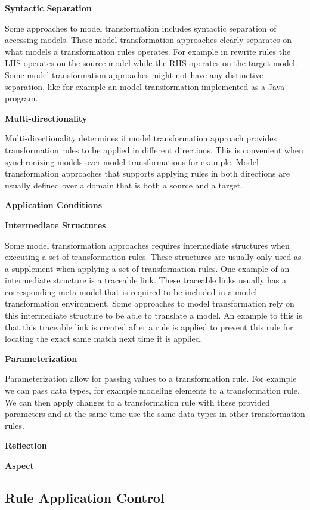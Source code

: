 \textbf{Syntactic Separation}

Some approaches to model transformation includes syntactic separation of
accessing models. These model transformation approaches clearly separates on
what models a transformation rules operates. For example in rewrite rules the
LHS operates on the source model while the RHS operates on the target model.
Some model transformation approaches might not have any distinctive separation,
like for example an model transformation implemented as a Java program. 

\textbf{Multi-directionality}

Multi-directionality determines if model transformation approach provides
transformation rules to be applied in different directions. This is convenient
when synchronizing models over model transformations for example. Model
transformation approaches that supports applying rules in both directions are
usually defined over a domain that is both a source and a target.


\textbf{Application Conditions}

\textbf{Intermediate Structures}

Some model transformation approaches requires intermediate structures when
executing a set of transformation rules. These structures are usually only
used as a supplement when applying a set of transformation rules. One
example of an intermediate structure is a traceable link. These traceable links
usually has a corresponding meta-model that is required to be included in a
model transformation environment. Some approaches to model transformation rely
on this intermediate structure to be able to translate a model. An example to
this is that this traceable link is created after a rule is applied to prevent
this rule for locating the exact same match next time it is applied. 

\textbf{Parameterization}

Parameterization allow for passing values to a transformation rule. For example
we can pass data types, for example modeling elements to a transformation rule.
We can then apply changes to a transformation rule with these provided
parameters and at the same time use the same data types in other
transformation rules.

\textbf{Reflection}

\textbf{Aspect}



\subsection{Rule Application Control}
\label{sec:app_control}

